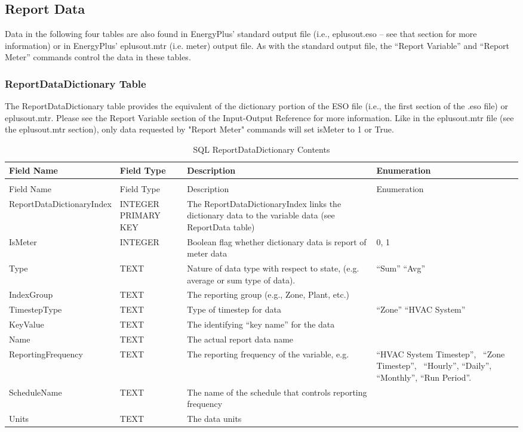\subsection{Report Data}

Data in the following four tables are also found in EnergyPlus’ standard output file (i.e., eplusout.eso – see that section for more information) or in EnergyPlus' eplusout.mtr (i.e. meter) output file. As with the standard output file, the “Report Variable” and “Report Meter” commands control the data in these tables.

\subsubsection{ReportDataDictionary Table}

The ReportDataDictionary table provides the equivalent of the dictionary portion of the ESO file (i.e., the first section of the .eso file) or eplusout.mtr. Please see the Report Variable section of the Input-Output Reference for more information.  Like in the eplusout.mtr file (see the eplusout.mtr section), only data requested by "Report Meter" commands will set isMeter to 1 or True.

{\scriptsize
\begin{longtable}[c]{>{\raggedright}p{1.5in}>{\raggedright}p{1.5in}>{\raggedright}p{1.5in}>{\raggedright}p{1.5in}}
\caption{SQL ReportDataDictionary Contents \label{table:table-7.-sql-reportdatadictionary-contents}} \tabularnewline
\toprule
Field Name & Field Type & Description & Enumeration \tabularnewline
\midrule
\endfirsthead

\caption[]{SQL ReportDataDictionary Contents} \tabularnewline
\toprule
Field Name & Field Type & Description & Enumeration \tabularnewline
\midrule
\endhead

Report\-Data\-Dictionary\-Index & INTEGER PRIMARY KEY & The ReportDataDictionaryIndex links the dictionary data to the variable data (see ReportData table) & ~ \tabularnewline
IsMeter & INTEGER & Boolean flag whether dictionary data is report of meter data & 0, 1 \tabularnewline
Type & TEXT & Nature of data type with respect to state, (e.g. average or sum type of data). & “Sum” “Avg” \tabularnewline
IndexGroup & TEXT & The reporting group (e.g., Zone, Plant, etc.) & ~ \tabularnewline
TimestepType & TEXT & Type of timestep for data & “Zone”
    “HVAC System” \tabularnewline
KeyValue & TEXT & The identifying “key name” for the data & ~ \tabularnewline
Name & TEXT & The actual report data name & ~ \tabularnewline
ReportingFrequency & TEXT & The reporting frequency of the variable, e.g. & “HVAC System Timestep”,~ “Zone Timestep”,~ “Hourly”, “Daily”, “Monthly”, “Run Period”. \tabularnewline
ScheduleName & TEXT & The name of the schedule that controls reporting frequency & ~ \tabularnewline
Units & TEXT & The data units & ~ \tabularnewline
\bottomrule
\end{longtable}}

